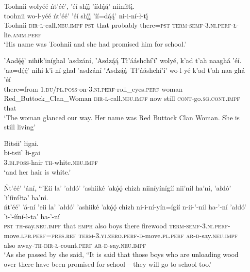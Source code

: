 \ea\label{ex:text1-30-3}
Toohnii wolyéé ńt’éé’, ’éí shį́į́ ’íídą́ą́’ niiníłtį́.\\
\gll toohnii	wo-l-yéé	ńt’éé’	’éí	shį́į́	’íí=dą́ą́’	ni-i-ní-ł-tį́\\
     Toohnii	\textsc{dir}-\textsc{l}-call.\textsc{neu}.\textsc{impf}	\textsc{pst}	that	probably	there=\textsc{pst}	\textsc{term}-\textsc{semf}-3.\textsc{ni}.\textsc{perf}-\textsc{ł}-lie.\textsc{anim}.\textsc{perf}\\
\glt `His name was Toohnii and she had promised him for school.'
\z

\ea\label{ex:text1-30-4}
’Aadę́ę́’ nihik’iníghal ’asdzání, ’Asdzą́ą́ Tł’ááshchí’í’ wolyé, k’ad t’ah naaghá ’éí.\\
\gll ’aa=dę́ę́’	nihi-k’i-ní-ghal	’asdzání	’Asdzą́ą́~{Tł’ááshchí’í’}	wo-l-yé	k’ad	t’ah	naa-ghá	’éí\\
     there=from	1.\textsc{du}/\textsc{pl}.\textsc{poss}-on-3.\textsc{ni}.\textsc{perf}-roll\_eyes.\textsc{perf}	woman	Red\_Buttock\_Clan\_Woman	\textsc{dir}-\textsc{l}-call.\textsc{neu}.\textsc{impf}	now	still	\textsc{cont}-go.\textsc{sg}.\textsc{cont}.\textsc{impf}	that\\
\glt `The woman glanced our way. Her name was Red Buttock Clan Woman. She is still living'
\z

\ea\label{ex:text1-30-5}
Bitsii’ łigai.\\
\gll bi-tsii’	łi-gai\\
     3.\textsc{bi}.\textsc{poss}-hair	\textsc{th}-white.\textsc{neu}.\textsc{impf}\\
\glt `and her hair is white.'
\z

\ea\label{ex:text1-30-6}
Ńt’éé’ ’ání, ``’Eii la’ ’ałdó’ ’ashiiké ’akǫ́ǫ́ chizh niiníyínígíí nii’nil ha’ní, ’ałdó’ ’i’ííníłta’ ha’ní.\\
\gll ńt’éé’	’á-ní	’eii	la’	’ałdó’	’ashiiké	’akǫ́ǫ́	chizh	ni-i-ní-yín=ígíí	n-ii-’-nil	ha-’-ní	’ałdó’	’i-’-ííní-ł-ta’	ha-’-ní\\
     \textsc{pst}	\textsc{th}-say.\textsc{neu}.\textsc{impf}	that	\textsc{emph}	also	boys	there	firewood	\textsc{term}-\textsc{semf}-3.\textsc{ni}.\textsc{perf}-move.\textsc{lpb}.\textsc{perf}=\textsc{pres}.\textsc{ref}	\textsc{term}-3.\textsc{yi}.\textsc{zero}.\textsc{perf}-\textsc{d}-move.\textsc{pl}.\textsc{perf}	\textsc{ar}-\textsc{d}-say.\textsc{neu}.\textsc{impf}	also	away-\textsc{th}-\textsc{dir}-\textsc{ł}-count.\textsc{perf}	\textsc{ar}-\textsc{d}-say.\textsc{neu}.\textsc{impf}\\
\glt `As she passed by she said, ``It is said that those boys who are unloading wood over there have been promised for school -- they will go to school too.'
\z


